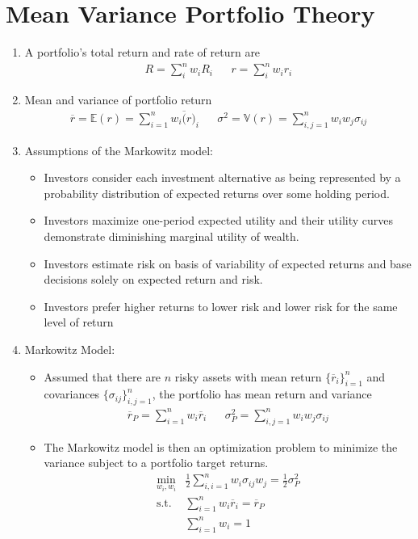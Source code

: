 \documentclass[12pt,twoside]{article}
\begin{document}
\newpage

\section{Mean Variance Portfolio Theory}
\begin{enumerate}
\item A portfolio's total return and rate of return are
	\begin{align*}
		R = \sum_i^n w_iR_i	&&
		r  = \sum_i^n w_ir_i
	\end{align*}

\item Mean and variance of portfolio return
\begin{align*}
	\overline{r} 	= \mathbb{E}(r) = \sum_{i=1}^n w_i \overline(r)_i		&&
	\sigma^2 		= \mathbb{V}(r) = \sum_{i,j=1}^n w_iw_j\sigma_{ij}
\end{align*}

\item Assumptions of the Markowitz model:
\begin{itemize}
	\item Investors consider each investment alternative as being represented by a probability distribution of expected returns over some holding period.
	\item Investors maximize one-period expected utility and their utility curves demonstrate diminishing marginal utility of wealth.
	\item Investors estimate risk on basis of variability of expected returns and base decisions solely on expected return and risk.
	\item Investors prefer higher returns to lower risk and lower risk for the same level of return
\end{itemize}

\item Markowitz Model:
\begin{itemize}
	\item Assumed that there are $n$ risky assets with mean return $\lbrace \overline{r}_i\rbrace_{i=1}^n$ and covariances $\lbrace \sigma_{ij}\rbrace_{i,j=1}^n$, the portfolio has mean return and variance
	\begin{align*}
		\overline{r}_P	= \sum_{i=1}^n w_i \overline{r}_i	&&
		\sigma_P^2		= \sum_{i,j=1}^n w_iw_j\sigma_{ij}
	\end{align*}
	
	\item The Markowitz model is then an optimization problem to minimize the variance subject to a portfolio target returns. 
	\begin{align*}
		\min_{w_i, w_i}	& \frac{1}{2}\sum_{i,i=1}^n w_i\sigma_{ij}w_j = \frac{1}{2}\sigma^2_P\\
		\text{s.t.  	}		& \sum_{i=1}^n w_i\overline{r}_i = \overline{r}_P\\
								&	\sum_{i=1}^n w_i = 1
	\end{align*}
	

\end{itemize}
\end{enumerate}
\end{document}
